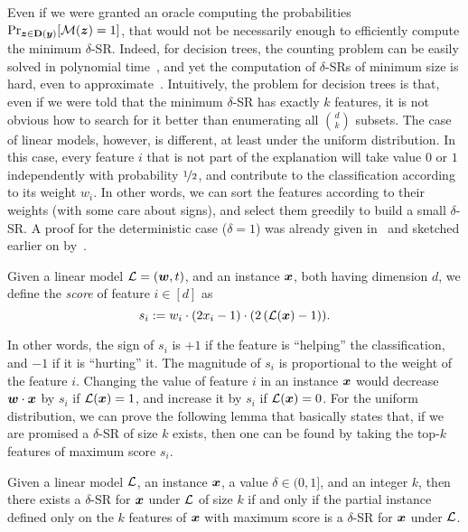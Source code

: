 Even if we were granted an oracle computing the probabilities
\(
    \Pr_{{\bm{z}}  \in \mathbf{D}({\bm{y}})}[\mathcal{M}({\bm{z}}) = 1]
\), that would not be necessarily enough to efficiently compute the minimum $\delta$-SR. Indeed, for decision trees, the counting problem can be easily solved in polynomial time~\cite{NEURIPS2020_b1adda14}, and yet the computation of $\delta$-SRs of minimum size is hard, even to approximate~\cite{Arenas_Barcelo_Romero_Subercaseaux_2022,Kozachinskiy_2023}.
Intuitively, the problem for decision trees is that, even if we were told that the minimum $\delta$-SR has exactly $k$ features, it is not obvious how to search for it better than enumerating all $\binom{d}{k}$ subsets. The case of linear models, however, is different, at least under the uniform distribution. In this case, every feature $i$ that is not part of the explanation will take value $0$ or $1$ independently with probability $\nicefrac{1}{2}$, and contribute to the classification according to its weight $w_i$. In other words, we can sort the features according to their weights (with some care about signs), and select them greedily to build a small $\delta$-SR. A proof for the deterministic case ($\delta = 1$) was already given in~\cite{NEURIPS2020_b1adda14} and sketched earlier on by~\cite{ExplainingNaiveBayes}.

\begin{definition}\label{def:scores}
    Given a linear model $\mathcal{L} = ({\bm{w}}, t)$, and an instance ${\bm{x}}$, both having dimension $d$, we define the \emph{score} of feature $i \in [d]$ as 
    \[
        s_i := w_i \cdot (2x_i - 1) \cdot (2\left(\mathcal{L}({\bm{x}}) - 1\right)).    
    \]
\end{definition}

In other words, the sign of $s_i$ is $+1$ if the feature is ``helping'' the classification, and $-1$ if it is ``hurting'' it. The magnitude of $s_i$ is proportional to the weight of the feature $i$. Changing the value of feature $i$ in an instance ${\bm{x}}$ would decrease ${\bm{w}} \cdot {\bm{x}}$ by $s_i$ if $\mathcal{L}({\bm{x}}) = 1$, and increase it by $s_i$ if $\mathcal{L}({\bm{x}}) = 0$.
For the uniform distribution, we can prove the following lemma that basically states that, if we are promised a $\delta$-SR of size $k$ exists, then one can be found by taking the top-$k$ features of maximum score $s_i$.

\begin{lemma}\label{lemma:greedy}
Given a linear model $\mathcal{L}$, an instance ${\bm{x}}$,  a value $\delta \in (0, 1]$, and an integer $k$, then there exists a $\delta$-SR for ${\bm{x}}$ under $\mathcal{L}$ of size $k$ if and only if the partial instance defined only on the $k$ features of ${\bm{x}}$ with maximum score is a $\delta$-SR for ${\bm{x}}$ under $\mathcal{L}$.
\end{lemma}

